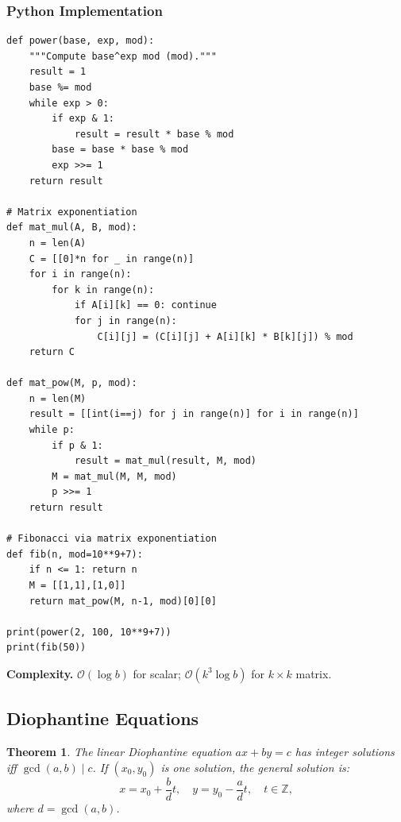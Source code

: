 \documentclass[10pt,a4paper]{article}
\theoremstyle{cpstyle}
\newtheorem{theorem}{Theorem}[section]
\newcommand{\bigO}[1]{\mathcal{O}\!\left(#1\right)}
\newcommand{\Z}{\mathbb{Z}}
\begin{document}
\subsubsection{Python Implementation}
\begin{lstlisting}[caption={Binary Exponentiation -- matrix and modular versions}]
def power(base, exp, mod):
    """Compute base^exp mod (mod)."""
    result = 1
    base %= mod
    while exp > 0:
        if exp & 1:
            result = result * base % mod
        base = base * base % mod
        exp >>= 1
    return result

# Matrix exponentiation
def mat_mul(A, B, mod):
    n = len(A)
    C = [[0]*n for _ in range(n)]
    for i in range(n):
        for k in range(n):
            if A[i][k] == 0: continue
            for j in range(n):
                C[i][j] = (C[i][j] + A[i][k] * B[k][j]) % mod
    return C

def mat_pow(M, p, mod):
    n = len(M)
    result = [[int(i==j) for j in range(n)] for i in range(n)]
    while p:
        if p & 1:
            result = mat_mul(result, M, mod)
        M = mat_mul(M, M, mod)
        p >>= 1
    return result

# Fibonacci via matrix exponentiation
def fib(n, mod=10**9+7):
    if n <= 1: return n
    M = [[1,1],[1,0]]
    return mat_pow(M, n-1, mod)[0][0]

print(power(2, 100, 10**9+7))
print(fib(50))
\end{lstlisting}

\textbf{Complexity.} $\bigO{\log b}$ for scalar; $\bigO{k^3 \log b}$ for $k \times k$ matrix.

\subsection{Diophantine Equations}

\begin{theorem}
The linear Diophantine equation $ax + by = c$ has integer solutions iff $\gcd(a,b) \mid c$.
If $(x_0, y_0)$ is one solution, the general solution is:
\[
  x = x_0 + \frac{b}{d}t, \quad y = y_0 - \frac{a}{d}t, \quad t \in \Z,
\]
where $d = \gcd(a,b)$.
\end{theorem}
\end{document}
